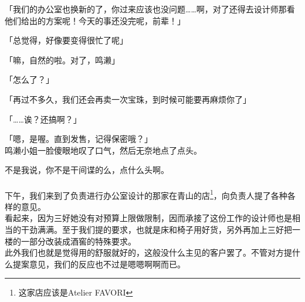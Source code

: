 「我们的办公室也换新的了，你过来应该也没问题……啊，对了还得去设计师那看他们给出的方案呢！今天的事还没完呢，前辈！」

「总觉得，好像要变得很忙了呢」

「嘛，自然的啦。对了，鸣濑」

「怎么了？」

「再过不多久，我们还会再卖一次宝珠，到时候可能要再麻烦你了」

「……诶？还搞啊？」

「嗯，是喔。直到发售，记得保密哦？」\\

鸣濑小姐一脸傻眼地叹了口气，然后无奈地点了点头。

不是我说，你不是干间谍的么，点什么头啊。\\

\sqsplit\\

下午，我们来到了负责进行办公室设计的那家在青山的店\footnote{这家店应该是Atelier FAVORI}，向负责人提了各种各样的意见。\\

看起来，因为三好她没有对预算上限做限制，因而承接了这份工作的设计师也是相当的干劲满满。至于我们提的要求，也就是床和椅子用好货，另外再加上三好把一楼的一部分改装成酒窖的特殊要求。\\

此外我们也就是觉得用的舒服就好的，这般没什么主见的客户罢了。不管对方提什么提案意见，我们的反应也不过是嗯嗯啊啊而已。\\

